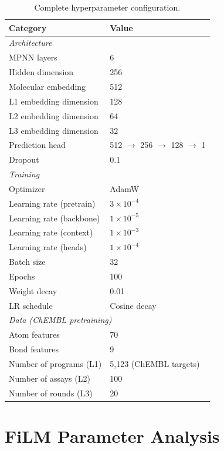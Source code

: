 \documentclass[sigconf]{acmart}
\begin{document}
\begin{table}[h]
\caption{Complete hyperparameter configuration.}
\label{tab:hyperparams}
\centering
\small
\begin{tabular}{@{}ll@{}}
\toprule
\textbf{Category} & \textbf{Value} \\
\midrule
\multicolumn{2}{l}{\textit{Architecture}} \\
\quad MPNN layers & 6 \\
\quad Hidden dimension & 256 \\
\quad Molecular embedding & 512 \\
\quad L1 embedding dimension & 128 \\
\quad L2 embedding dimension & 64 \\
\quad L3 embedding dimension & 32 \\
\quad Prediction head & 512 $\rightarrow$ 256 $\rightarrow$ 128 $\rightarrow$ 1 \\
\quad Dropout & 0.1 \\
\midrule
\multicolumn{2}{l}{\textit{Training}} \\
\quad Optimizer & AdamW \\
\quad Learning rate (pretrain) & $3 \times 10^{-4}$ \\
\quad Learning rate (backbone) & $1 \times 10^{-5}$ \\
\quad Learning rate (context) & $1 \times 10^{-3}$ \\
\quad Learning rate (heads) & $1 \times 10^{-4}$ \\
\quad Batch size & 32 \\
\quad Epochs & 100 \\
\quad Weight decay & 0.01 \\
\quad LR schedule & Cosine decay \\
\midrule
\multicolumn{2}{l}{\textit{Data (ChEMBL pretraining)}} \\
\quad Atom features & 70 \\
\quad Bond features & 9 \\
\quad Number of programs (L1) & 5{,}123 (ChEMBL targets) \\
\quad Number of assays (L2) & 100 \\
\quad Number of rounds (L3) & 20 \\
\bottomrule
\end{tabular}
\end{table}

\section{FiLM Parameter Analysis}
\label{app:film}
\end{document}
